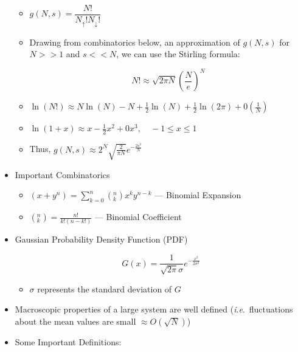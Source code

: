 \begin{itemize}
\begin{itemize}
          \item $g(N,s)=\dfrac{N!}{N_{\uparrow}!N_{\downarrow}!}$

          \item Drawing from combinatorics below, an approximation of $g(N,s)$ for $N>>1$ and $s<<N$, we can use the Stirling formula:

            $$N!\approx\sqrt{2\pi N}\left( \frac{N}{e} \right)^N$$

          \item $\ln(N!)\approx N\ln(N)-N+\frac{1}{2}\ln(N)+\frac{1}{2}\ln(2\pi)+0\left( \frac{1}{N} \right)$

          \item $\ln(1+x)\approx x-\frac{1}{2}x^2+0x^3,\quad -1\leq x\leq 1$

          \item Thus, $g(N,s)\approx 2^N\sqrt{\frac{2}{\pi N}}e^{-\frac{2s^2}{N}}$

    \end{itemize}

  \item Important Combinatorics

    \begin{itemize}

      \item $(x+y^n)=\displaystyle\sum_{k=0}^n \left( ^n_k \right)x^ky^{n-k}$ — Binomial Expansion

      \item \large$\left( ^n_k \right)=\frac{n!}{k!(n-k!)}$ \normalsize — Binomial Coefficient

    \end{itemize}

  \item Gaussian Probability Density Function (PDF)

    $$G(x)=\frac{1}{\sqrt{2\pi}\sigma}e^{-\frac{x^2}{2\sigma^2}}$$

    \begin{itemize}

      \item $\sigma$ represents the standard deviation of $G$

    \end{itemize}

  \item Macroscopic properties of a large system are well defined (\textit{i}.\textit{e}.\ fluctuations about the mean values are small $\approx O(\sqrt{N})$)

  \item Some Important Definitions:


\end{itemize}

